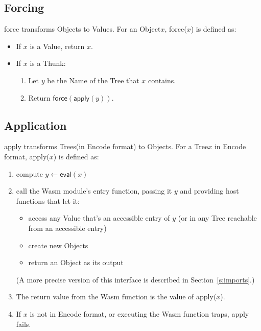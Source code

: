 \documentclass{article}
\newcommand{\valuex}{\textrm{Value}\xspace}
\newcommand{\valuexs}{\textrm{Value}s\xspace}
\newcommand{\object}{\textrm{Object}\xspace}
\newcommand{\objects}{\textrm{Object}s\xspace}
\newcommand{\encode}{\textrm{Encode}\xspace}
\newcommand{\thunk}{\textrm{Thunk}\xspace}
\newcommand{\name}{\textrm{Name}\xspace}
\newcommand{\tree}{\textrm{Tree}\xspace}
\newcommand{\trees}{\textrm{Tree}s\xspace}
\newcommand{\eval}{\textsf{eval}}
\newcommand{\apply}{\textsf{apply}}
\newcommand{\force}{\textsf{force}}
\begin{document}
\subsection{Forcing}

\force{} transforms \objects to \valuexs.  For an \object $x$, \force($x$) is defined as:
\begin{itemize}[itemsep=0pt]
\item If $x$ is a \valuex, return $x$.

\item If $x$ is a \thunk:
  \begin{enumerate}[topsep=0pt,itemsep=0pt]
  \item Let $y$ be the \name of the \tree that $x$ contains.
  \item Return $\force(\apply(y))$.
  \end{enumerate}
\end{itemize}

\subsection{Application}

\apply{} transforms \trees (in \encode format) to \objects. For a \tree $x$ in \encode format, \apply($x$) is defined as:

\begin{enumerate}[itemsep=0pt]
\item compute $y \leftarrow \eval(x)$
\item call the Wasm module's entry function, passing it $y$ and providing host functions that let it:
  \begin{itemize}[topsep=0pt, itemsep=0pt]
  \item access any \valuex that's an accessible entry of $y$ (or in any \tree reachable from an accessible entry)
  \item create new \objects
  \item return an \object as its output
  \end{itemize}
  (A more precise version of this interface is described in Section~\ref{s:imports}.)
\item The return value from the Wasm function is the value of \apply($x$).
\item If $x$ is not in \encode format, or executing the Wasm function traps, \apply{} fails.
\end{enumerate}
      
\end{document}
